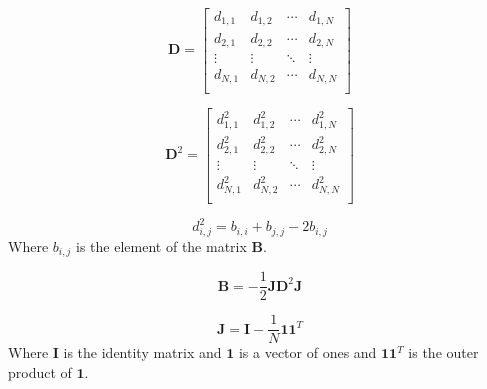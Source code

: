 \documentclass[10pt]{article}
\begin{document}
\begin{multicols}{2}
\begin{equation}
    \mathbf{D} = \begin{bmatrix}
        d_{1,1} & d_{1,2} & \cdots & d_{1,N} \\
        d_{2,1} & d_{2,2} & \cdots & d_{2,N} \\
        \vdots & \vdots & \ddots & \vdots \\
        d_{N,1} & d_{N,2} & \cdots & d_{N,N} \\
    \end{bmatrix}
\end{equation}

\begin{equation}
    \mathbf{D}^2 = \begin{bmatrix}
        d_{1,1}^2 & d_{1,2}^2 & \cdots & d_{1,N}^2 \\
        d_{2,1}^2 & d_{2,2}^2 & \cdots & d_{2,N}^2 \\
        \vdots & \vdots & \ddots & \vdots \\
        d_{N,1}^2 & d_{N,2}^2 & \cdots & d_{N,N}^2 \\
    \end{bmatrix}
\end{equation}

\begin{equation}
    d_{i,j}^2 = b_{i,i} + b_{j,j} - 2b_{i,j}
\end{equation}
Where $b_{i,j}$ is the element of the matrix $\mathbf{B}$.

\begin{equation}
    \mathbf{B} = -\frac{1}{2} \mathbf{J} \mathbf{D}^2 \mathbf{J}
\end{equation}

\begin{equation}
    \mathbf{J} = \mathbf{I} - \frac{1}{N} \mathbf{1} \mathbf{1}^T
\end{equation}
Where $\mathbf{I}$ is the identity matrix and $\mathbf{1}$ is a vector of ones and $\mathbf{11}^T$ is the outer product of $\mathbf{1}$.


\end{multicols}
\end{document}
